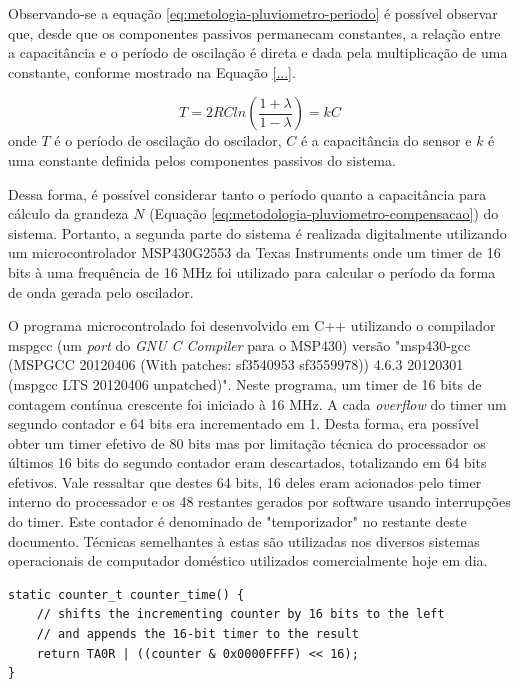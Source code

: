 \documentclass[a4paper]{instrumentacao}
\begin{document}

Observando-se a equação \ref{eq:metologia-pluviometro-periodo} é possível observar que, desde que os componentes passivos permanecam constantes, a relação entre a capacitância e o período de oscilação é direta e dada pela multiplicação de uma constante, conforme mostrado na Equação \ref{...}.

\begin{equation}
	T = 2 R C ln \left(\frac{1+\lambda}{1-\lambda}\right) = k C
	\label{eq:metologia-pluviometro-periodo-simplificado}
\end{equation}
\noindent onde $T$ é o período de oscilação do oscilador, $C$ é a capacitância do sensor e $k$ é uma constante definida pelos componentes passivos do sistema.

Dessa forma, é possível considerar tanto o período quanto a capacitância para cálculo da grandeza $N$ (Equação \ref{eq:metodologia-pluviometro-compensacao}) do sistema. Portanto, a segunda parte do sistema é realizada digitalmente utilizando um microcontrolador MSP430G2553 da Texas Instruments onde um timer de 16 bits à uma frequência de 16 MHz foi utilizado para calcular o período da forma de onda gerada pelo oscilador.

O programa microcontrolado foi desenvolvido em C++ utilizando o compilador mspgcc (um \textit{port} do \textit{GNU C Compiler} para o MSP430) versão "msp430-gcc (MSPGCC 20120406 (With patches: sf3540953 sf3559978)) 4.6.3 20120301 (mspgcc LTS 20120406 unpatched)". Neste programa, um timer de 16 bits de contagem contínua crescente foi iniciado à 16 MHz. A cada \textit{overflow} do timer um segundo contador e 64 bits era incrementado em 1. Desta forma, era possível obter um timer efetivo de 80 bits mas por limitação técnica do processador os últimos 16 bits do segundo contador eram descartados, totalizando em 64 bits efetivos. Vale ressaltar que destes 64 bits, 16 deles eram acionados pelo timer interno do processador e os 48 restantes gerados por software usando interrupções do timer. Este contador é denominado de "temporizador" no restante deste documento. Técnicas semelhantes à estas são utilizadas nos diversos sistemas operacionais de computador doméstico utilizados comercialmente hoje em dia.

\begin{lstlisting}[caption=Rotina de extração do timer do temporizador]
static counter_t counter_time() {
	// shifts the incrementing counter by 16 bits to the left
    // and appends the 16-bit timer to the result
	return TA0R | ((counter & 0x0000FFFF) << 16);
}
\end{lstlisting}
\end{document}
